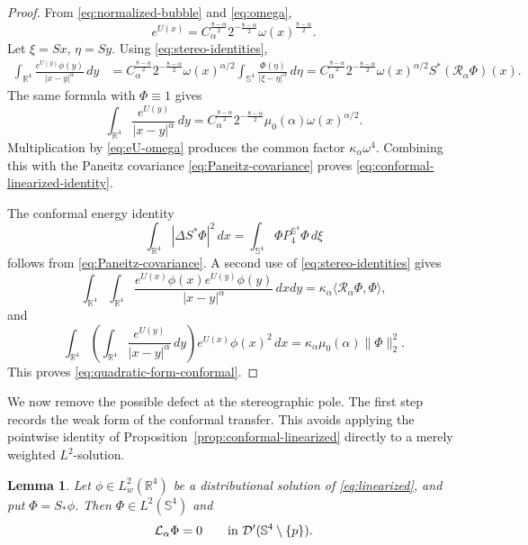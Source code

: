 \documentclass[11pt]{article}
\newtheorem{lemma}[theorem]{Lemma}
\numberwithin{equation}{section}
\begin{document}
\begin{proof}
From \eqref{eq:normalized-bubble} and \eqref{eq:omega},
\begin{equation}\label{eq:eU-omega}
e^{U(x)}
=C_{\alpha}^{\frac{8-\alpha}{2}}2^{-\frac{8-\alpha}{2}}
\omega(x)^{\frac{8-\alpha}{2}}.
\end{equation}
Let \(\xi=Sx\), \(\eta=Sy\). Using \eqref{eq:stereo-identities},
\[
\begin{aligned}
\int_{\mathbb R^{4}}
\frac{e^{U(y)}\phi(y)}{|x-y|^{\alpha}}\,dy
&=C_{\alpha}^{\frac{8-\alpha}{2}}2^{-\frac{8-\alpha}{2}}
\omega(x)^{\alpha/2}
\int_{\mathbb S^{4}}
\frac{\Phi(\eta)}{|\xi-\eta|^{\alpha}}\,d\eta=C_{\alpha}^{\frac{8-\alpha}{2}}2^{-\frac{8-\alpha}{2}}
\omega(x)^{\alpha/2}
S^{*}(\mathcal R_{\alpha}\Phi)(x).
\end{aligned}
\]
The same formula with \(\Phi\equiv1\) gives
\[
\int_{\mathbb R^{4}}
\frac{e^{U(y)}}{|x-y|^{\alpha}}\,dy
=C_{\alpha}^{\frac{8-\alpha}{2}}2^{-\frac{8-\alpha}{2}}
\mu_{0}(\alpha)\omega(x)^{\alpha/2}.
\]
Multiplication by \eqref{eq:eU-omega} produces the common factor \(\kappa_{\alpha}\omega^{4}\). Combining this with the Paneitz covariance \eqref{eq:Paneitz-covariance} proves \eqref{eq:conformal-linearized-identity}.

The conformal energy identity
\[
\int_{\mathbb R^{4}}|\Delta S^{*}\Phi|^{2}\,dx
=\int_{\mathbb S^{4}}\Phi P_{4}^{\mathbb S^{4}}\Phi\,d\xi
\]
follows from \eqref{eq:Paneitz-covariance}. A second use of \eqref{eq:stereo-identities} gives
\[
\int_{\mathbb R^{4}}\int_{\mathbb R^{4}}
\frac{e^{U(x)}\phi(x)e^{U(y)}\phi(y)}{|x-y|^{\alpha}}\,dxdy
=\kappa_{\alpha}\langle\mathcal R_{\alpha}\Phi,\Phi\rangle,
\]
and
\[
\int_{\mathbb R^{4}}
\left(\int_{\mathbb R^{4}}
\frac{e^{U(y)}}{|x-y|^{\alpha}}\,dy\right)
e^{U(x)}\phi(x)^{2}\,dx
=\kappa_{\alpha}\mu_{0}(\alpha)\|\Phi\|_{2}^{2}.
\]
This proves \eqref{eq:quadratic-form-conformal}.
\end{proof}

We now remove the possible defect at the stereographic pole. The first step records the weak form of the conformal transfer. This avoids applying the pointwise identity of Proposition~\ref{prop:conformal-linearized} directly to a merely weighted \(L^{2}\)-solution.

\begin{lemma}\label{lem:weak-conformal-transfer}
Let \(\phi\in L^{2}_{w}(\mathbb R^{4})\) be a distributional solution of
\eqref{eq:linearized}, and put \(\Phi=S_{*}\phi\). Then
\(\Phi\in L^{2}(\mathbb S^{4})\) and
\begin{equation}\label{eq:sphere-away-pole}
\mathcal L_{\alpha}\Phi=0
\qquad\hbox{in }\mathcal D'(\mathbb S^{4}\setminus\{p\}).
\end{equation}
\end{lemma}
\end{document}
